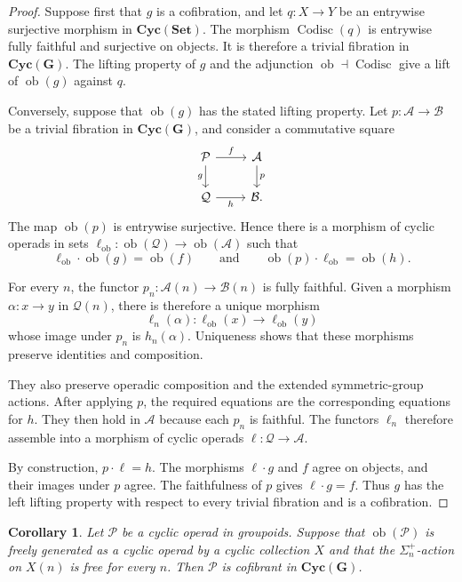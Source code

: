 \documentclass{amsart}
\newcommand{\Set}{\mathbf{Set}}
\newcommand{\Grpd}{\mathbf{G}}
\newcommand{\Cyc}{\mathbf{Cyc}}
\newcommand{\ob}{\operatorname{ob}}
\newtheorem{cor}[theorem]{Corollary}%
\theoremstyle{definition}
\numberwithin{equation}{section}
\begin{document}
\begin{proof}
Suppose first that $g$ is a cofibration, and let
$q\colon X\to Y$ be an entrywise surjective morphism in
$\Cyc(\Set)$. The morphism $\operatorname{Codisc}(q)$ is entrywise
fully faithful and surjective on objects. It is therefore a trivial
fibration in $\Cyc(\Grpd)$. The lifting property of $g$ and the
adjunction $\ob\dashv\operatorname{Codisc}$ give a lift of
$\ob(g)$ against $q$.

Conversely, suppose that $\ob(g)$ has the stated lifting property.
Let $p\colon\mathcal A\to\mathcal B$ be a trivial fibration in
$\Cyc(\Grpd)$, and consider a commutative square
\[
\begin{tikzcd}
\mathcal P \arrow[r,"f"] \arrow[d,"g"'] &
\mathcal A \arrow[d,"p"] \\
\mathcal Q \arrow[r,"h"'] &
\mathcal B.
\end{tikzcd}
\]
The map $\ob(p)$ is entrywise surjective. Hence there is a morphism
of cyclic operads in sets
$\ell_{\mathrm{ob}}\colon\ob(\mathcal Q)\to\ob(\mathcal A)$ such
that
\[
\ell_{\mathrm{ob}}\cdot\ob(g)=\ob(f)
\qquad\text{and}\qquad
\ob(p)\cdot\ell_{\mathrm{ob}}=\ob(h).
\]

For every $n$, the functor
$p_n\colon\mathcal A(n)\to\mathcal B(n)$ is fully faithful. Given a
morphism $\alpha\colon x\to y$ in $\mathcal Q(n)$, there is therefore
a unique morphism
\[
\ell_n(\alpha)\colon
\ell_{\mathrm{ob}}(x)\longrightarrow\ell_{\mathrm{ob}}(y)
\]
whose image under $p_n$ is $h_n(\alpha)$. Uniqueness shows that these
morphisms preserve identities and composition.

They also preserve operadic composition and the extended
symmetric-group actions. After applying $p$, the required equations
are the corresponding equations for $h$. They then hold in
$\mathcal A$ because each $p_n$ is faithful. The functors $\ell_n$
therefore assemble into a morphism of cyclic operads
$\ell\colon\mathcal Q\to\mathcal A$.

By construction, $p\cdot\ell=h$. The morphisms $\ell\cdot g$ and
$f$ agree on objects, and their images under $p$ agree. The
faithfulness of $p$ gives $\ell\cdot g=f$. Thus $g$ has the left
lifting property with respect to every trivial fibration and is a
cofibration.
\end{proof}

\begin{cor}
\label{cor:free-cyc-cof}
Let $\mathcal P$ be a cyclic operad in groupoids. Suppose that
$\ob(\mathcal P)$ is freely generated as a cyclic operad by a cyclic
collection $X$ and that the $\Sigma_n^+$-action on $X(n)$ is free for
every $n$. Then $\mathcal P$ is cofibrant in $\Cyc(\Grpd)$.
\end{cor}
\end{document}
